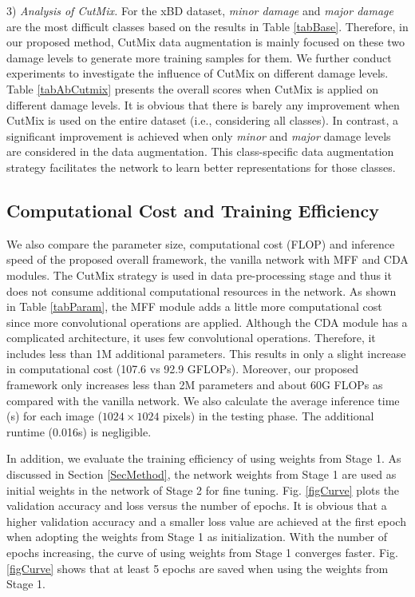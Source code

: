 \documentclass[journal]{IEEEtran}
\begin{document}
3) \textit{Analysis of CutMix.}
For the xBD dataset, \textit{minor damage} and \textit{major damage} are the most difficult classes based on the results in Table \ref{tabBase}. Therefore, in our proposed method, CutMix data augmentation is mainly focused on these two damage levels to generate more training samples for them. We further conduct experiments to investigate the influence of CutMix on different damage levels. Table \ref{tabAbCutmix} presents the overall scores when CutMix is applied on different damage levels. It is obvious that there is barely any improvement when CutMix is used on the entire dataset (i.e., considering all classes). In contrast, a significant improvement is achieved when only \textit{minor} and \textit{major} damage levels are considered in the data augmentation. This class-specific data augmentation strategy facilitates the network to learn better representations for those classes. 

\subsection{Computational Cost and Training Efficiency}
We also compare the parameter size, computational cost (FLOP) and inference speed of the proposed overall framework, the vanilla network with MFF and CDA modules. The CutMix strategy is used in data pre-processing stage and thus it does not consume additional computational resources in the network.   
As shown in Table \ref{tabParam}, the MFF module adds a little more computational cost since more convolutional operations are applied. Although the CDA module has a complicated architecture, it uses few convolutional operations. Therefore, it includes less than 1M additional parameters.  This results in only a slight increase in computational cost (107.6 vs 92.9 GFLOPs). Moreover, our proposed framework only increases less than 2M parameters and about 60G FLOPs as compared with the vanilla network.  We also calculate the average inference time (s) for each image ($1024\times1024$ pixels) in the testing phase. The additional runtime (0.016s) is negligible. 


In addition, we evaluate the training efficiency of using weights from Stage 1. As discussed in Section \ref{SecMethod}, the network weights from Stage 1 are used as initial weights in the network of Stage 2 for fine tuning. Fig. \ref{figCurve} plots the validation accuracy and loss versus the number of epochs. It is obvious that a higher validation accuracy and a smaller loss value are achieved at the first epoch when adopting the weights from Stage 1 as initialization. With the number of epochs increasing, the curve of using weights from Stage 1 converges faster. Fig. \ref{figCurve} shows that at least 5 epochs are saved when using the weights from Stage 1.
\end{document}
